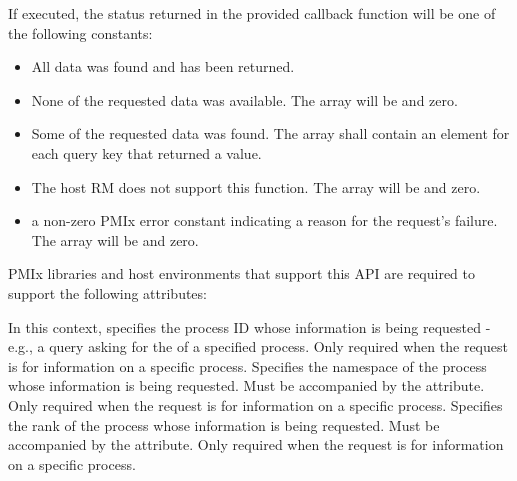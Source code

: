 \returnsimple

If executed, the status returned in the provided callback function will be one of the following constants:

\begin{itemize}
\item {} All data was found and has been returned.

\item {} None of the requested data was available.
The  array will be  and  zero.

\item {} Some of the requested data was found.
The  array shall contain an element for each query key that returned a value.

\item {} The host \ac{RM} does not support this function. The  array will be  and  zero.

\item a non-zero \ac{PMIx} error constant indicating a reason for the request's failure. The  array will be  and  zero.
\end{itemize}

\reqattrstart
\ac{PMIx} libraries and host environments that support this \ac{API} are required to support the following attributes:

In this context, specifies the process ID whose information is being requested - e.g., a query asking for the  of a specified process. Only required when the request is for information on a specific process.
\pasteAttributeItemEnd
{}Specifies the namespace of the process whose information is being requested. Must be accompanied by the  attribute. Only required when the request is for information on a specific process.
\pasteAttributeItemEnd
{}Specifies the rank of the process whose information is being requested. Must be accompanied by the  attribute. Only required when the request is for information on a specific process.
\pasteAttributeItemEnd
{}

